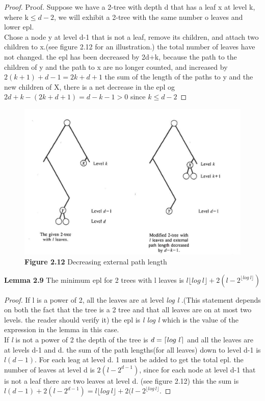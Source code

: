 \documentclass[a4paper,10pt,titlepage]{report}
\DeclarePairedDelimiter{\ceil}{\lceil}{\rceil}
\begin{document}
\begin{proof}
Proof. Suppose we have a 2-tree with depth d that has a leaf x at level k, where k$ \leq d-2$, we will exhibit a 2-tree with the same number o leaves and lower epl.\\ Chose a node y at level d-1 that is not a leaf, remove its children, and attach two children to x.(see figure 2.12 for an illustration.) the total number of leaves have not changed. the epl has been decreased by 2d+k, because the path to the children of y and the path to x are no longer counted, and increased by $2(k+1)+d-1 = 2k+d+1$ the sum of the length of the paths to y and the new children of X, there is a net decrease in the epl og $2d+k-(2k+d+1) = d-k-1 > 0 $ since $k\leq d-2$
\end{proof} 
\vspace{5mm}
\begin{figure}[h]
\includegraphics[scale=0.3]{notes_2_12.png}
\caption{\textbf{Figure 2.12} Decreasing external path length}
\end{figure}
\vspace{5mm}
\textbf{Lemma 2.9} The minimum epl for 2 trees with l leaves is $l \lfloor{log \ l}\rfloor+ 2(l-2^{\lfloor log \ l\rfloor})$

\begin{proof}
If l is a power of 2, all the leaves are at level \textit{log l} .(This statement depends on both the fact that the tree is a 2 tree and that all leaves are on at most two levels. the reader should verify it) the epl is \textit{l log l} which is the value of the expression in the lemma in this case.\\
If \textit{l} is not a power of 2 the depth of the tree is $d = \ceil{log \ l} $ and all the leaves are at levels d-1 and d. the sum of the path lengths(for all leaves) down to level d-1 is $l(d-1)$. For each leag at level d. 1 must be added to get the total epl. the number of leaves at level d is $2(l-2^{d-1})$, since for each node at level d-1 that is not a leaf there are two leaves at level d. (see figure 2.12) this the sum is $l(d-1)+2(l-2^{d-1}) = l \lfloor log \ l \rfloor +2(l-2^{\lfloor log \ l \rfloor}$. 
\end{proof}
\vspace{5mm}
\end{document}
